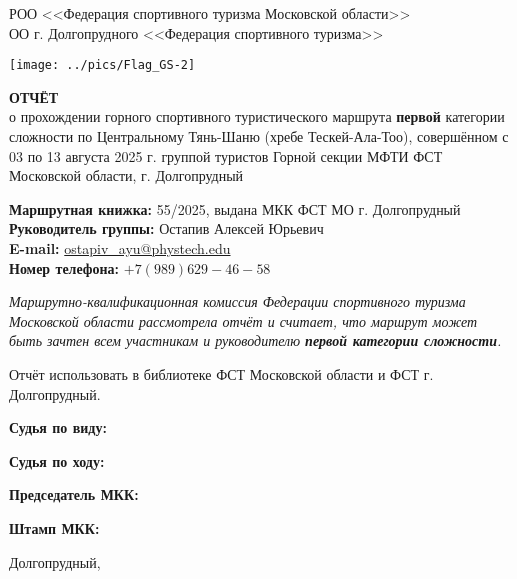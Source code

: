 \begin{titlepage}
\setlength\parindent{0pt}
	\begin{center}
		\large{РОО <<Федерация спортивного туризма Московской области>>\\
		ОО г. Долгопрудного <<Федерация спортивного туризма>>\\}
	\end{center}

	


	
	\begin{center}
		\texttt{[image: ../pics/Flag\_GS-2]}
		
		\Large{\bfseries{ОТЧЁТ}} \\
		\normalsize о прохождении горного спортивного туристического маршрута \textbf{первой} категории сложности по Центральному Тянь-Шаню (хребе Тескей-Ала-Тоо), совершённом с 03 по 13 августа 2025 г. группой туристов Горной секции МФТИ ФСТ Московской области, г. Долгопрудный
	\end{center}
	\vspace{1.5 cm}
	
	\textbf{Маршрутная книжка:} 55/2025, выдана МКК ФСТ МО г. Долгопрудный \\ 
	\textbf{Руководитель группы:} Остапив Алексей Юрьевич\\
	\textbf{E-mail:} \href{mailto: ostapiv\_ayu@phystech.edu}{ostapiv\_ayu@phystech.edu}\\
	\textbf{Номер телефона:} $+7(989)629-46-58$
	
	\vspace{0.2cm}
	
	\textit{Маршрутно-квалификационная комиссия Федерации спортивного туризма Московской области рассмотрела отчёт и считает, что маршрут может быть зачтен всем участникам и руководителю \textbf{первой категории сложности}.}

	\vspace{0.2cm}
	
	Отчёт использовать в библиотеке ФСТ Московской области и ФСТ г. Долгопрудный.
	
	\vspace{0.8cm}
	\textbf{Судья по виду:} 
	
	\vspace{0.8cm}
	\textbf{Судья по ходу:}
	
	\vspace{0.8cm}
	\textbf{Председатель МКК:}
	
	\vspace{0.8cm}
	\textbf{Штамп МКК:}
	
	\vfill
	\begin{center}
		Долгопрудный,   \the\year{}
	\end{center}
\end{titlepage}